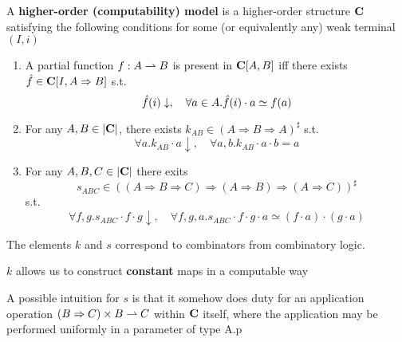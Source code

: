 \documentclass[11pt]{article}
\begin{document}
\begin{definition}[]
\label{3.1.13}
A \textbf{higher-order (computability) model} is a higher-order structure \(\operatorname{\textbf{C}}\) satisfying the following
conditions for some (or equivalently any) weak terminal \((I,i)\)
\begin{enumerate}
\item A partial function \(f:A\rightharpoonup B\) is present in \(\operatorname{\textbf{C}}[A,B]\) iff there
exists \(\hat{f}\in\operatorname{\textbf{C}}[I,A\Rightarrow B]\) s.t.
\begin{equation*}
\hat{f}(i)\downarrow,\quad\forall a\in A.\hat{f}(i)\cdot a\simeq f(a)
\end{equation*}
\item For any \(A,B\in\abs{\bC}\), there exists \(k_{AB}\in(A\Rightarrow B\Rightarrow A)^\sharp\) s.t.
\begin{equation*}
\forall a.k_{AB}\cdot a\downarrow,\quad \forall a,b.k_{AB}\cdot a\cdot b=a
\end{equation*}
\item For any \(A,B,C\in\abs{\bC}\) there exits
\begin{equation*}
s_{ABC}\in((A\Rightarrow B\Rightarrow C)\Rightarrow(A\Rightarrow B)\Rightarrow(A\Rightarrow C))^\sharp
\end{equation*}
s.t.
\begin{equation*}
\forall f,g.s_{ABC}\cdot f\cdot g\downarrow,\quad\forall f,g,a.s_{ABC}\cdot f\cdot g\cdot a\simeq(f\cdot a)\cdot(g\cdot a)
\end{equation*}
\end{enumerate}
\end{definition}

The elements \(k\) and \(s\) correspond to combinators from combinatory logic.

\(k\) allows us to construct \textbf{constant} maps in a computable way

A possible intuition for \(s\) is that it somehow does duty for an application
operation \((B\Rightarrow C)\times B\rightharpoonup C\)
within \(\operatorname{\textbf{C}}\) itself, where the application may be performed uniformly in a parameter of type A.p
\end{document}
